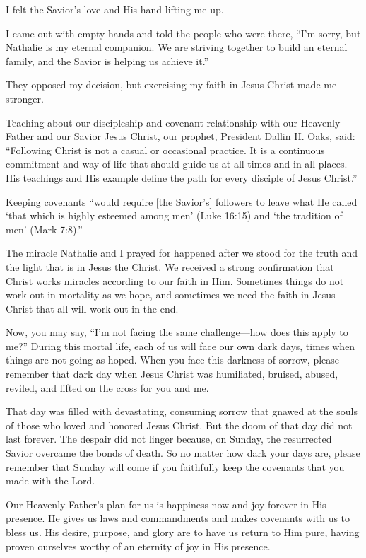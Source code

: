 \documentclass[letterpaper, 11pt]{report}
\begin{document}
I felt the Savior’s love and His hand lifting me up.

I came out with empty hands and told the people who were there, “I’m sorry, but Nathalie is my eternal companion. We are striving together to build an eternal family, and the Savior is helping us achieve it.”

They opposed my decision, but exercising my faith in Jesus Christ made me stronger.

Teaching about our discipleship and covenant relationship with our Heavenly Father and our Savior Jesus Christ, our prophet, President Dallin H. Oaks, said: “Following Christ is not a casual or occasional practice. It is a continuous commitment and way of life that should guide us at all times and in all places. His teachings and His example define the path for every disciple of Jesus Christ.”

Keeping covenants “would require [the Savior’s] followers to leave what He called ‘that which is highly esteemed among men’ (Luke 16:15) and ‘the tradition of men’ (Mark 7:8).”

The miracle Nathalie and I prayed for happened after we stood for the truth and the light that is in Jesus the Christ. We received a strong confirmation that Christ works miracles according to our faith in Him. Sometimes things do not work out in mortality as we hope, and sometimes we need the faith in Jesus Christ that all will work out in the end.

Now, you may say, “I’m not facing the same challenge—how does this apply to me?” During this mortal life, each of us will face our own dark days, times when things are not going as hoped. When you face this darkness of sorrow, please remember that dark day when Jesus Christ was humiliated, bruised, abused, reviled, and lifted on the cross for you and me.

That day was filled with devastating, consuming sorrow that gnawed at the souls of those who loved and honored Jesus Christ. But the doom of that day did not last forever. The despair did not linger because, on Sunday, the resurrected Savior overcame the bonds of death. So no matter how dark your days are, please remember that Sunday will come if you faithfully keep the covenants that you made with the Lord.

Our Heavenly Father’s plan for us is happiness now and joy forever in His presence. He gives us laws and commandments and makes covenants with us to bless us. His desire, purpose, and glory are to have us return to Him pure, having proven ourselves worthy of an eternity of joy in His presence.
\end{document}
